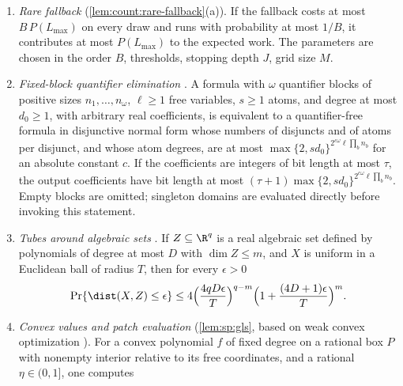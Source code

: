 \begin{enumerate}[label=(T\arabic*),leftmargin=*]
output (\cref{def:model:outputs}\ref{it:model:algebraic}) of the
lexicographically least global minimizer and of the optimal value: one
isolated real root and rational polynomial maps for every continuous
coordinate and for the value, with integer coordinates listed. Its length is
at most $B\poly_d(I+b)$. Enclosing each coordinate to width
$2^{-q-\lceil\log_2(n+1)\rceil}$ and the value to width $2^{-q}$ gives the
Euclidean point and value evaluation contract in $B\poly_d(I+b+q)$ work.
\item\label{it:app:rec:rare} \emph{Rare fallback}
(\cref{lem:count:rare-fallback}(a)). If the fallback costs at most
$B\,P(L_{\max})$ on every draw and runs with probability at most $1/B$, it
contributes at most $P(L_{\max})$ to the expected work. The parameters are
chosen in the order $B$, thresholds, stopping depth $J$, grid size $M$.
\item\label{it:app:rec:qe} \emph{Fixed-block quantifier elimination}
\citep[Theorem~1.1]{renegar1992-on-the-computational-complexity-and}. A formula with $\omega$ quantifier blocks
of positive sizes $n_1,\ldots,n_\omega$, $\ell\ge1$ free variables, $s\ge1$
atoms, and degree at most $d_0\ge1$, with arbitrary real coefficients, is equivalent to a
quantifier-free formula in disjunctive normal form whose numbers of
disjuncts and of atoms per disjunct, and whose atom degrees, are at most
$\max\{2,sd_0\}^{2^{c\omega}\ell\prod_bn_b}$ for an absolute constant $c$. If the
coefficients are integers of bit length at most $\tau$, the output
coefficients have bit length at most
$(\tau+1)\max\{2,sd_0\}^{2^{c\omega}\ell\prod_bn_b}$. Empty blocks are omitted;
singleton domains are evaluated directly before invoking this statement.
\item\label{it:app:rec:tube} \emph{Tubes around algebraic sets}
\citep[Theorem~1.1]{basu2021-hausdorff-approximations-and-volume-of}. If $Z\subseteq\R^q$ is a real algebraic
set defined by polynomials of degree at most $D$ with $\dim Z\le m$, and $X$
is uniform in a Euclidean ball of radius $T$, then for every $\epsilon>0$
\[
 \Pr\{\dist(X,Z)\le\epsilon\}
 \le4\Bigl(\frac{4qD\epsilon}T\Bigr)^{q-m}\Bigl(1+\frac{(4D+1)\epsilon}T\Bigr)^m .
\]
\item\label{it:app:rec:gls} \emph{Convex values and patch evaluation}
(\cref{lem:sp:gls}, based on weak convex optimization
\citep[Corollary~4.2.7]{grotschel1988-geometric-algorithms-and-combinatorial-optimization}). For a convex
polynomial $f$ of fixed degree on a rational box $P$ with nonempty interior
relative to its free coordinates, and a rational $\eta\in(0,1]$, one computes

\end{enumerate}
